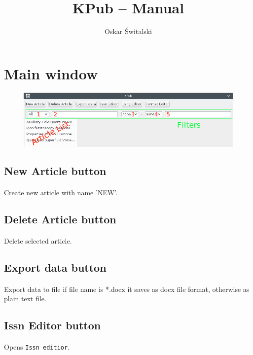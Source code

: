 \documentclass[a4paper,10pt]{article}
\title{KPub – Manual}
\author{Oskar Świtalski}
\date{}
\begin{document}
\maketitle

\section{Main window}
\begin{figure}[H]
 \centering
 \includegraphics[width=35em]{kpub-main.png}
\end{figure}

\subsection{New Article button}
\paragraph{}Create new article with name 'NEW'.
\subsection{Delete Article button}
\paragraph{}Delete selected article.
\subsection{Export data button}
\paragraph{}Export data to file if file name is *.docx it saves as docx file format, otherwise as plain text file.
\subsection{Issn Editor button}
\paragraph{}Opens \texttt{Issn editior}.
\end{document}
